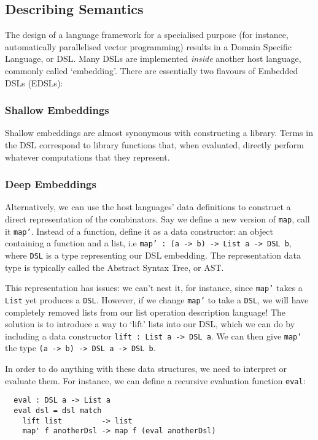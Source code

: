 \documentclass[a4paper,12pt]{article}
\newcommand{\icf}[1]{\mbox{\texttt{#1}}} %
\begin{document}
\subsection{Describing Semantics}
The design of a language framework for a specialised purpose (for instance, automatically parallelised vector programming) results in a Domain Specific Language, or DSL. 
Many DSLs are implemented \textit{inside} another host language, commonly called `embedding'. There are essentially two flavours of Embedded DSLs (EDSLs):

\subsubsection*{Shallow Embeddings} 
Shallow embeddings are almost synonymous with constructing a library. 
Terms in the DSL correspond to library functions that, when evaluated, directly perform whatever computations that they represent.

\subsubsection*{Deep Embeddings} 
Alternatively, we can use the host languages' data definitions to construct a direct representation of the combinators. 
Say we define a new version of \icf{map}, call it \icf{map'}.
Instead of a function, define it as a data constructor: an object containing a function and a list, i.e \texttt{map'\ :\ (a\ ->\ b)\ ->\ List\ a\ ->\ DSL\ b}, where \icf{DSL} is a type representing our DSL embedding. 
The representation data type is typically called the Abstract Syntax Tree, or AST.

This representation has issues: we can't nest it, for instance, since \icf{map'} takes a \icf{List} yet produces a \icf{DSL}. 
However, if we change \icf{map'} to take a \icf{DSL}, we will have completely removed lists from our list operation description language! 
The solution is to introduce a way to `lift' lists into our DSL, which we can do by  including a data constructor \texttt{lift\ :\ List\ a\ ->\ DSL\ a}. 
We can then give \icf{map'} the type \icf{(a\ ->\ b)\ ->\ DSL\ a\ ->\ DSL\ b}.

In order to do anything with these data structures, we need to interpret or evaluate them. 
For instance, we can define a recursive evaluation function \icf{eval}:

\begin{verbatim}
  eval : DSL a -> List a
  eval dsl = dsl match
    lift list         -> list
    map' f anotherDsl -> map f (eval anotherDsl)
\end{verbatim}
\end{document}
